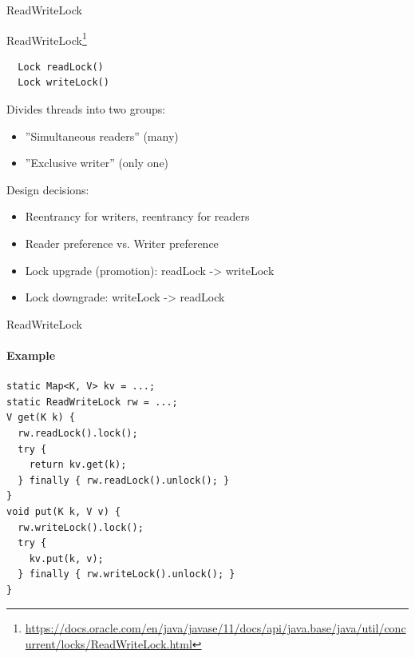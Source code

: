 \begin{frame}{ReadWriteLock}

ReadWriteLock\footnote{\tiny\url{https://docs.oracle.com/en/java/javase/11/docs/api/java.base/java/util/concurrent/locks/ReadWriteLock.html}}

\begin{verbatim}
  Lock readLock()
  Lock writeLock()
\end{verbatim}

Divides threads into two groups:
\begin{itemize}
    \item ''Simultaneous readers'' (many)
    \item ''Exclusive writer'' (only one)
\end{itemize}

Design decisions:
\begin{itemize}
    \item Reentrancy for writers, reentrancy for readers

    \item Reader preference vs. Writer preference

    \item Lock upgrade (promotion): readLock -> writeLock

    \item Lock downgrade: writeLock -> readLock    
\end{itemize}
\end{frame}


\begin{frame}[fragile]{ReadWriteLock}
\framesubtitle{Example}

\begin{verbatim}
static Map<K, V> kv = ...;
static ReadWriteLock rw = ...;
V get(K k) {
  rw.readLock().lock();
  try {
    return kv.get(k);
  } finally { rw.readLock().unlock(); }
}
void put(K k, V v) {
  rw.writeLock().lock();
  try {
    kv.put(k, v);
  } finally { rw.writeLock().unlock(); }
}
\end{verbatim}
\end{frame}


